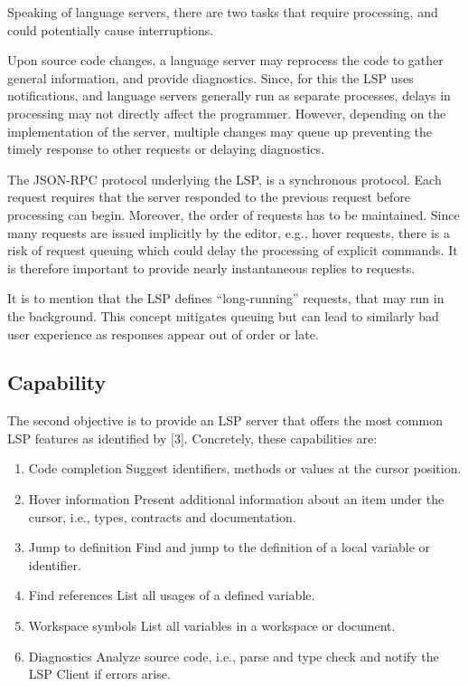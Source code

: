 \documentclass[
  a4paper,
  bibtex,
  english,
  nomenclature]{kthlatex/kththesis/kththesis}
\providecommand{\tightlist}{%
  \setlength{\itemsep}{0pt}\setlength{\parskip}{0pt}}
\begin{document}
Speaking of language servers, there are two tasks that require
processing, and could potentially cause interruptions.

Upon source code changes, a language server may reprocess the code to
gather general information, and provide diagnostics. Since, for this the
LSP uses notifications, and language servers generally run as separate
processes, delays in processing may not directly affect the programmer.
However, depending on the implementation of the server, multiple changes
may queue up preventing the timely response to other requests or
delaying diagnostics.

The JSON-RPC protocol underlying the LSP, is a synchronous protocol.
Each request requires that the server responded to the previous request
before processing can begin. Moreover, the order of requests has to be
maintained. Since many requests are issued implicitly by the editor,
e.g., hover requests, there is a risk of request queuing which could
delay the processing of explicit commands. It is therefore important to
provide nearly instantaneous replies to requests.

It is to mention that the LSP defines ``long-running'' requests, that
may run in the background. This concept mitigates queuing but can lead
to similarly bad user experience as responses appear out of order or
late.

\hypertarget{sec:capability}{%
\subsection{Capability}\label{sec:capability}}

The second objective is to provide an LSP server that offers the most
common LSP features as identified by {[}3{]}. Concretely, these
capabilities are:

\begin{enumerate}
\def\labelenumi{\arabic{enumi}.}
\tightlist
\item
  Code completion Suggest identifiers, methods or values at the cursor
  position.
\item
  Hover information Present additional information about an item under
  the cursor, i.e., types, contracts and documentation.
\item
  Jump to definition Find and jump to the definition of a local variable
  or identifier.
\item
  Find references List all usages of a defined variable.
\item
  Workspace symbols List all variables in a workspace or document.
\item
  Diagnostics Analyze source code, i.e., parse and type check and notify
  the LSP Client if errors arise.
\end{enumerate}
\end{document}

